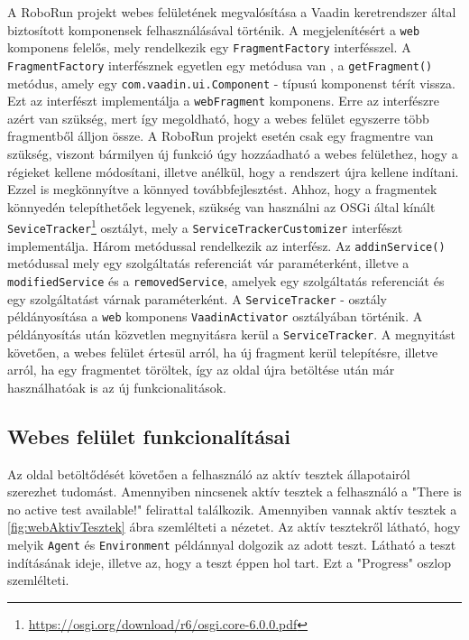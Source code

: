 A RoboRun projekt webes felületének megvalósítása a Vaadin keretrendszer által biztosított komponensek felhasználásával történik. A megjelenítésért a \texttt{web} komponens felelős, mely rendelkezik egy \texttt{FragmentFactory} interfésszel. A \texttt{FragmentFactory} interfésznek egyetlen egy metódusa van , a \texttt{getFragment()} metódus, amely egy \texttt{com.vaadin.ui.Component} - típusú komponenst térít vissza. Ezt az interfészt implementálja a \texttt{webFragment} komponens. Erre az interfészre azért van szükség, mert így megoldható, hogy a webes felület egyszerre több fragmentből álljon össze. A RoboRun projekt esetén csak egy fragmentre van szükség, viszont bármilyen új funkció úgy hozzáadható a webes felülethez, hogy a régieket kellene módosítani, illetve anélkül, hogy a rendszert újra kellene indítani. Ezzel is megkönnyítve a könnyed továbbfejlesztést. Ahhoz, hogy a fragmentek könnyedén telepíthetőek legyenek, szükség van használni az OSGi által kínált \texttt{SeviceTracker}\footnote{\href {https://osgi.org/download/r6/osgi.core-6.0.0.pdf}{https://osgi.org/download/r6/osgi.core-6.0.0.pdf}} osztályt, mely a \texttt{ServiceTrackerCustomizer} interfészt implementálja. Három metódussal rendelkezik az interfész. Az \texttt{addinService()} metódussal mely egy szolgáltatás referenciát vár paraméterként, illetve a \texttt{modifiedService} és a \texttt{removedService}, amelyek egy szolgáltatás referenciát és egy szolgáltatást várnak paraméterként. A \texttt{ServiceTracker} - osztály példányosítása a \texttt{web} komponens \texttt{VaadinActivator} osztályában történik. A példányosítás után közvetlen megnyitásra kerül a \texttt{ServiceTracker}. A megnyitást követően, a webes felület értesül arról, ha új fragment kerül telepítésre, illetve arról, ha egy fragmentet töröltek, így az oldal újra betöltése után már használhatóak is az új funkcionalitások.

\subsection{Webes felület funkcionalításai}\label{subsec:WebesFeluletFunkcioi}
Az oldal betöltődését követően a felhasználó az aktív tesztek állapotairól szerezhet tudomást. Amennyiben nincsenek aktív tesztek a felhasználó a "There is no active test available!" felirattal találkozik. Amennyiben vannak aktív tesztek a \ref{fig:webAktivTesztek} ábra szemlélteti a nézetet. Az aktív tesztekről látható, hogy melyik \texttt{Agent} és \texttt{Environment} példánnyal dolgozik az adott teszt. Látható a teszt indításának ideje, illetve az, hogy a teszt éppen hol tart. Ezt a "Progress" oszlop szemlélteti.

